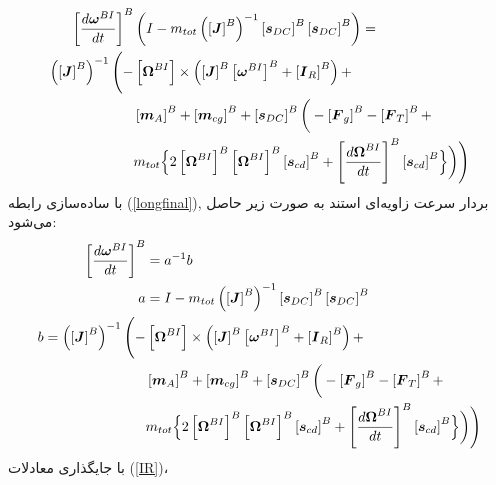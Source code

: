 \begin{equation}\label{longfinal}
	\begin{split}
		\left[\dfrac{d\boldsymbol\omega^{BI}}{dt}\right]^B  & \left(
		I - m_{tot} \left(\left[\boldsymbol J\right]^B\right)^{-1}
		\left[\boldsymbol s_{DC}\right]^B
		\left[\boldsymbol s_{DC}\right]^B\right) = \\
		\left(\left[\boldsymbol J\right]^B\right)^{-1}\Bigg(
		-&\left[\boldsymbol\Omega^{BI}\right]\times\left(
		\left[\boldsymbol J\right]^B\left[\boldsymbol\omega^{BI}\right]^B
		+\left[\boldsymbol I_R\right]^B\right) + \\
		&\left[\boldsymbol m_A\right]^B + \left[\boldsymbol m_{cg}\right]^B+\left[\boldsymbol s_{DC}\right]^B
		\bigg(-\left[\boldsymbol F_g\right]^B
		-\left[\boldsymbol F_T\right]^B+ \\
		&m_{tot}\Bigl\{2
		\left[\boldsymbol\Omega^{BI}\right]^B
		\left[\boldsymbol\Omega^{BI}\right]^B
		\left[\boldsymbol s_{cd}\right]^B+
		\left[\dfrac{d\boldsymbol\Omega^{BI}}{dt}\right]^B
		\left[\boldsymbol s_{cd}\right]^B
		\Bigr\}\bigg)\Bigg)		
	\end{split}
\end{equation}
با ساده‌سازی رابطه
(\ref{longfinal}),
بردار سرعت زاویه‌ای استند به صورت زیر حاصل می‌شود:
\begin{equation}\label{finaltorquefinal}
	\begin{split}
		\left[\dfrac{d\boldsymbol\omega^{BI}}{dt}\right]^B &= a^{-1}b\\
		a &= I - m_{tot}\left(\left[\boldsymbol J\right]^B\right)^{-1}
		\left[\boldsymbol s_{DC}\right]^B
		\left[\boldsymbol s_{DC}\right]^B\\
		b = \left(\left[\boldsymbol J\right]^B\right)^{-1}\Bigg(
		-&\left[\boldsymbol\Omega^{BI}\right]\times\left(
		\left[\boldsymbol J\right]^B\left[\boldsymbol\omega^{BI}\right]^B
		+\left[\boldsymbol I_R\right]^B\right) + \\
		&\left[\boldsymbol m_A\right]^B+ \left[\boldsymbol m_{cg}\right]^B +\left[\boldsymbol s_{DC}\right]^B
		\bigg(-\left[\boldsymbol F_g\right]^B
		-\left[\boldsymbol F_T\right]^B+ \\
		&m_{tot}\Bigl\{2
		\left[\boldsymbol\Omega^{BI}\right]^B
		\left[\boldsymbol\Omega^{BI}\right]^B
		\left[\boldsymbol s_{cd}\right]^B+
		\left[\dfrac{d\boldsymbol\Omega^{BI}}{dt}\right]^B
		\left[\boldsymbol s_{cd}\right]^B
		\Bigr\}\bigg)\Bigg)		
	\end{split}
\end{equation}
با جایگذاری معادلات
 (\ref{IR})،
